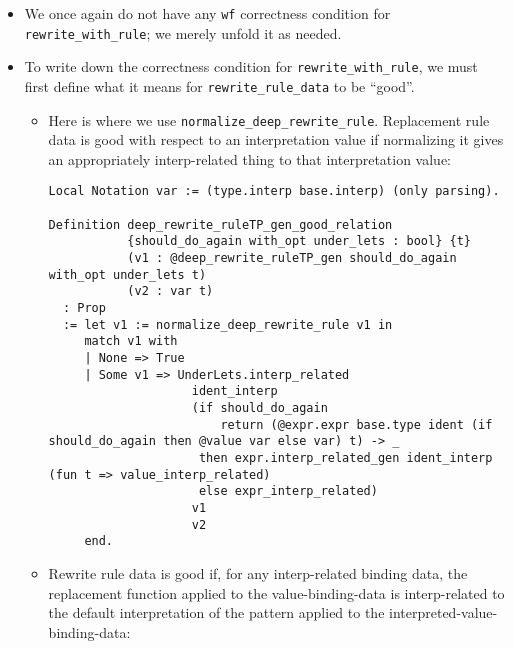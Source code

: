 \begin{itemize}
\begin{itemize}
    \begin{itemize}
    \tightlist
    \item
      We once again do not have any \texttt{wf} correctness condition
      for \texttt{rewrite\_with\_rule}; we merely unfold it as needed.
    \item
      To write down the correctness condition for
      \texttt{rewrite\_with\_rule}, we must first define what it means
      for \texttt{rewrite\_rule\_data} to be ``good''.

      \begin{itemize}
      \item
        Here is where we use \texttt{normalize\_deep\_rewrite\_rule}.
        Replacement rule data is good with respect to an interpretation
        value if normalizing it gives an appropriately interp-related
        thing to that interpretation value:

\begin{verbatim}
Local Notation var := (type.interp base.interp) (only parsing).

Definition deep_rewrite_ruleTP_gen_good_relation
           {should_do_again with_opt under_lets : bool} {t}
           (v1 : @deep_rewrite_ruleTP_gen should_do_again with_opt under_lets t)
           (v2 : var t)
  : Prop
  := let v1 := normalize_deep_rewrite_rule v1 in
     match v1 with
     | None => True
     | Some v1 => UnderLets.interp_related
                    ident_interp
                    (if should_do_again
                        return (@expr.expr base.type ident (if should_do_again then @value var else var) t) -> _
                     then expr.interp_related_gen ident_interp (fun t => value_interp_related)
                     else expr_interp_related)
                    v1
                    v2
     end.
\end{verbatim}
      \item
        Rewrite rule data is good if, for any interp-related binding
        data, the replacement function applied to the value-binding-data
        is interp-related to the default interpretation of the pattern
        applied to the interpreted-value-binding-data:


\end{itemize}
\end{itemize}
\end{itemize}
\end{itemize}

